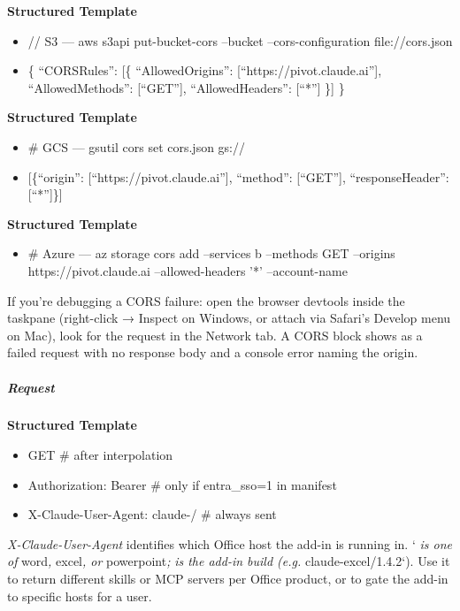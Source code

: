 \documentclass[11pt]{article}
\begin{document}
\textbf{Structured Template}
\begin{itemize}[leftmargin=*,itemsep=2pt,topsep=2pt]
\item {} // S3 — aws s3api put-bucket-cors --bucket --cors-configuration file://cors.json
\item {} \{ ``CORSRules'': [\{ ``AllowedOrigins'': [``https://pivot.claude.ai''], ``AllowedMethods'': [``GET''], ``AllowedHeaders'': [``*''] \}] \}
\end{itemize}

\textbf{Structured Template}
\begin{itemize}[leftmargin=*,itemsep=2pt,topsep=2pt]
\item {} \# GCS — gsutil cors set cors.json gs://
\item {} [\{``origin'': [``https://pivot.claude.ai''], ``method'': [``GET''], ``responseHeader'': [``*'']\}]
\end{itemize}

\textbf{Structured Template}
\begin{itemize}[leftmargin=*,itemsep=2pt,topsep=2pt]
\item {} \# Azure — az storage cors add --services b --methods GET --origins https://pivot.claude.ai --allowed-headers '*' --account-name
\end{itemize}

If you're debugging a CORS failure: open the browser devtools inside the taskpane (right-click → Inspect on Windows, or attach via Safari's Develop menu on Mac), look for the request in the Network tab. A CORS block shows as a failed request with no response body and a console error naming the origin.


\subparagraph{Request}\mbox{}\par

\textbf{Structured Template}
\begin{itemize}[leftmargin=*,itemsep=2pt,topsep=2pt]
\item {} GET \# after interpolation
\item {} Authorization: Bearer \# only if entra\_\allowbreak{}sso=1 in manifest
\item {} X-Claude-User-Agent: claude-/ \# always sent
\end{itemize}

\emph{X-Claude-User-Agent} identifies which Office host the add-in is running in. `\emph{ is one of }word\emph{, }excel\emph{, or }powerpoint\emph{; }\emph{ is the add-in build (e.g. }claude-excel/1.4.2`). Use it to return different skills or MCP servers per Office product, or to gate the add-in to specific hosts for a user.
\end{document}
